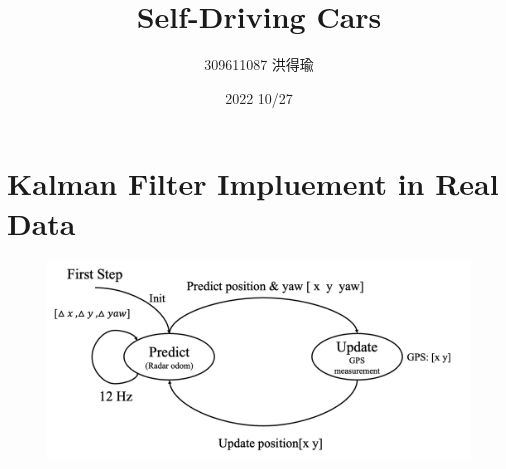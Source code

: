\documentclass{article}
\title{Self-Driving Cars}
\author{309611087 洪得瑜}
\date{2022 10/27}
\begin{document}
\maketitle

\section{Kalman Filter Impluement in Real Data}
\begin{figure}[H]
\centering
\includegraphics[scale = 0.2]{./state.png}
\end{figure}
\end{document}
